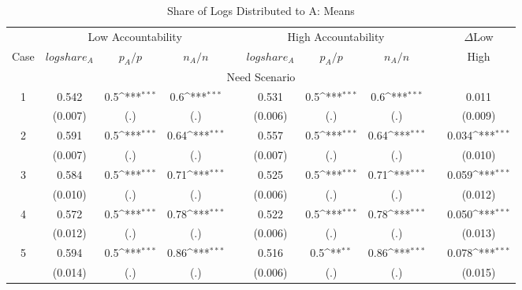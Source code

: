 \documentclass[smallcondensed]{svjour3}
\begin{document}
\begin{table}
\centering
\caption{Share of Logs Distributed to A: Means}\label{tab:share_means}
{\footnotesize
\def\sym#1{\ifmmode^{#1}\else\(^{#1}\)\fi}
\begin{tabularx}{13.5cm}{cccccccccc}\hline
          & \multicolumn{3}{c}{Low Accountability}              &   & \multicolumn{3}{c}{High Accountability}            &   & $\Delta$Low       \\\cline{2-4}\cline{6-8}
   Case   & $logshare_A$   & $p_A/p$        & $n_A/n$           &   & $logshare_A$   & $p_A/p$         & $n_A/n$         &   & High              \\\hline\hline
   \multicolumn{10}{c}{Need Scenario}                                                                                                            \\
   1      &   0.542        & 0.5\sym{***}   &  0.6\sym{***}     &   &  0.531         &  0.5\sym{***}   & 0.6\sym{***}    &   &  0.011            \\
          & (0.007)        & (.)            &  (.)              &   & (0.006)        &  (.)            & (.)             &   & (0.009)           \\
   2      &  0.591         & 0.5\sym{***}   &  0.64\sym{***}    &   &  0.557         &  0.5\sym{***}   & 0.64\sym{***}   &   &  0.034\sym{***}   \\
          & (0.007)        & (.)            &  (.)              &   & (0.007)        &  (.)            & (.)             &   & (0.010)           \\
   3      &  0.584         & 0.5\sym{***}   &  0.71\sym{***}    &   &  0.525         &  0.5\sym{***}   & 0.71\sym{***}   &   &  0.059\sym{***}   \\
          & (0.010)        & (.)            &  (.)              &   & (0.006)        &  (.)            & (.)             &   & (0.012)           \\
   4      &  0.572         & 0.5\sym{***}   &  0.78\sym{***}    &   &  0.522         &  0.5\sym{***}   & 0.78\sym{***}   &   &  0.050\sym{***}   \\
          & (0.012)        & (.)            &  (.)              &   & (0.006)        &  (.)            & (.)             &   & (0.013)           \\
   5      &  0.594         & 0.5\sym{***}   &  0.86\sym{***}    &   &  0.516         &  0.5\sym{**}    & 0.86\sym{***}   &   &  0.078\sym{***}   \\
          & (0.014)        & (.)            &  (.)              &   & (0.006)        &  (.)            & (.)             &   & (0.015)           \\\hline

\end{tabularx}}
\end{table}
\end{document}
